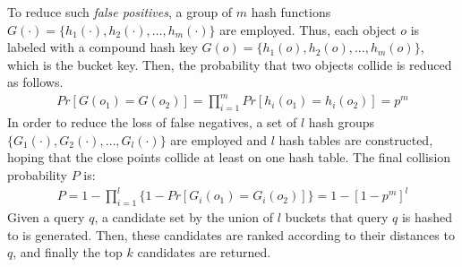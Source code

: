 To reduce such
\emph{false positives}, a group of $m$ hash functions
$G(\cdot)=\{h_1(\cdot),h_2(\cdot),\ldots,h_m(\cdot)\}$ are employed. Thus, each object $o$ is labeled with a compound hash key
$G(o)=\{h_1(o),h_2(o),\ldots,h_m(o)\}$, which is the bucket key. Then, the probability that two objects collide is reduced as follows.
\begin{equation}\label{eq:prob1}
%
\begin{aligned}
%
  Pr[G(o_1)=G(o_2)]=\prod_{i=1}^m Pr[h_i(o_1)=h_i(o_2)]=p^m
%
\end{aligned}
%
\end{equation}
In order to reduce the loss of false negatives, a set of $l$ hash groups $\{G_1(\cdot),G_2(\cdot),\ldots,G_l(\cdot)\}$ are employed and $l$ hash tables are constructed, hoping that the close points collide at least on one hash table. The final collision probability $P$ is:
\begin{equation}\label{eq:prob2}
%
\begin{aligned}
%
  P=1-\prod_{i=1}^l \Big\{1-Pr[G_i(o_1)=G_i(o_2)]\Big\}=1-[1-p^m]^l
\end{aligned}
%
\end{equation}
Given a query $q$, a candidate set by the union of $l$ buckets that
query $q$ is hashed to is generated. Then, these candidates are ranked according to their distances to $q$, and finally the top $k$ candidates are returned.
